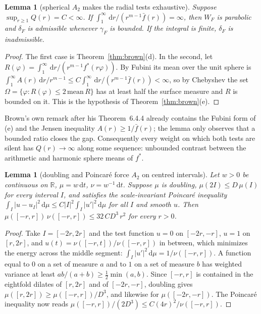 \documentclass[a4paper,11pt,noarxiv]{quantumarticle}
\newcommand{\R}{\mathbb{R}}
\newcommand{\abs}[1]{\lvert #1\rvert}
\newcommand{\dd}{\,\mathrm{d}}
\newcommand{\fbar}{\bar f}
\theoremstyle{plain}
\newtheorem{lemma}[proposition]{Lemma}
\theoremstyle{definition}
\theoremstyle{remark}
\begin{document}
\begin{lemma}[spherical $A_2$ makes the radial tests exhaustive]
\label{lem:k8}
Suppose $\sup_{r\ge1}Q(r)=C<\infty$. If
$\int_1^\infty\dd r/(r^{m-1}\fbar(r))=\infty$, then $W_F$ is parabolic
and $\delta_F$ is admissible whenever $\gamma_F$ is bounded. If the
integral is finite, $\delta_F$ is inadmissible.
\end{lemma}

\begin{proof}
The first case is Theorem~\ref{thm:brown}(d). In the second, let
$R(\varphi)=\int_1^\infty\dd r/(r^{m-1}f^*(r\varphi))$. By Fubini its
mean over the unit sphere is
$\int_1^\infty A(r)\dd r/r^{m-1}\le C\int_1^\infty\dd r/(r^{m-1}\fbar(r))<\infty$,
so by Chebyshev the set $\Omega=\{\varphi:R(\varphi)\le2\,\mathrm{mean}\,R\}$
has at least half the surface measure and $R$ is bounded on it. This
is the hypothesis of Theorem~\ref{thm:brown}(e).
\end{proof}

Brown's own remark after his Theorem~6.4.4 already contains the Fubini
form of (e) and the Jensen inequality $A(r)\ge1/\fbar(r)$; the lemma
only observes that a bounded ratio closes the gap. Consequently every
weight on which both tests are silent has $Q(r)\to\infty$ along some
sequence: unbounded contrast between the arithmetic and harmonic sphere
means of $f^*$.

\begin{lemma}[doubling and Poincar\'e force $A_2$ on centred intervals]
\label{lem:k9}
Let $w>0$ be continuous on $\R$, $\mu=w\dd t$, $\nu=w^{-1}\dd t$.
Suppose $\mu$ is doubling, $\mu(2I)\le D\,\mu(I)$ for every interval
$I$, and satisfies the scale-invariant Poincar\'e inequality
$\int_I\abs{u-u_I}^2\dd\mu\le C\abs{I}^2\int_I\abs{u'}^2\dd\mu$ for all
$I$ and smooth $u$. Then $\mu([-r,r])\,\nu([-r,r])\le 32\,CD^3\,r^2$
for every $r>0$.
\end{lemma}

\begin{proof}
Take $I=[-2r,2r]$ and the test function $u=0$ on $[-2r,-r]$, $u=1$ on
$[r,2r]$, and $u(t)=\nu([-r,t])/\nu([-r,r])$ in between, which
minimizes the energy across the middle segment:
$\int_I\abs{u'}^2\dd\mu=1/\nu([-r,r])$. A function equal to $0$ on a
set of measure $a$ and to $1$ on a set of measure $b$ has weighted
variance at least $ab/(a+b)\ge\tfrac12\min(a,b)$. Since $[-r,r]$ is
contained in the eightfold dilates of $[r,2r]$ and of $[-2r,-r]$,
doubling gives $\mu([r,2r])\ge\mu([-r,r])/D^3$, and likewise for
$\mu([-2r,-r])$. The Poincar\'e inequality now reads
$\mu([-r,r])/(2D^3)\le C(4r)^2/\nu([-r,r])$.
\end{proof}
\end{document}
